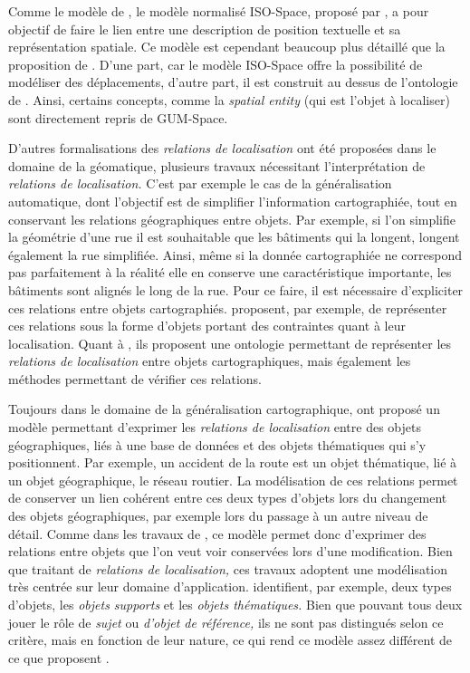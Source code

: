 Comme le modèle de \textcite{Vasardani2013}, le modèle normalisé
ISO-Space, proposé par \textcite{Pustejovsky2017}, a pour objectif de
faire le lien entre une description de position textuelle et sa
représentation spatiale. Ce modèle est cependant beaucoup plus
détaillé que la proposition de \textcite{Vasardani2013}. D'une part,
car le modèle ISO-Space offre la possibilité de modéliser des
déplacements, d'autre part, il est construit au dessus de l'ontologie
de \textcite{Bateman2010}. Ainsi, certains concepts, comme la
\emph{spatial entity} (qui est l'objet à localiser) sont directement
repris de GUM-Space.

D'autres formalisations des \emph{relations de localisation} ont été
proposées dans le domaine de la géomatique, plusieurs travaux
nécessitant l'interprétation de \emph{relations de localisation.}
C'est par exemple le cas de la généralisation automatique, dont
l'objectif est de simplifier l'information cartographiée, tout en
conservant les relations géographiques entre objets. Par exemple, si
l'on simplifie la géométrie d'une rue il est souhaitable que les
bâtiments qui la longent, longent également la rue simplifiée. Ainsi,
même si la donnée cartographiée ne correspond pas parfaitement à la
réalité elle en conserve une caractéristique importante, les bâtiments
sont alignés le long de la rue. Pour ce faire, il est nécessaire
d'expliciter ces relations entre objets
cartographiés. \textcite{Duchene2004,Gaffuri2008} proposent, par
exemple, de représenter ces relations sous la forme d'objets portant
des contraintes quant à leur localisation. Quant à
\textcite{Touya2012}, ils proposent une ontologie permettant de
représenter les \emph{relations de localisation} entre objets
cartographiques, mais également les méthodes permettant de vérifier
ces relations.

Toujours dans le domaine de la généralisation cartographique,
\textcite{Jaara2012} ont proposé un modèle permettant d'exprimer les
\emph{relations de localisation} entre des objets géographiques, liés
à une base de données et des objets thématiques qui s'y
positionnent. Par exemple, un accident de la route est un objet
thématique, lié à un objet géographique, le réseau routier. La
modélisation de ces relations permet de conserver un lien cohérent
entre ces deux types d'objets lors du changement des objets
géographiques, par exemple lors du passage à un autre niveau de
détail. Comme dans les travaux de \textcite{Duchene2004,Gaffuri2008,
  Touya2012}, ce modèle permet donc d'exprimer des relations entre
objets que l'on veut voir conservées lors d'une modification. Bien que
traitant de \emph{relations de localisation,} ces travaux adoptent une
modélisation très centrée sur leur domaine
d’application. \textcite{Jaara2012} identifient, par exemple, deux
types d'objets, les \emph{objets supports} et les \emph{objets
  thématiques.} Bien que pouvant tous deux jouer le rôle de
\emph{sujet} ou \emph{d'objet de référence,} ils ne sont pas
distingués selon ce critère, mais en fonction de leur nature, ce qui
rend ce modèle assez différent de ce que proposent
\textcite{Bateman2010,Pustejovsky2017}.

